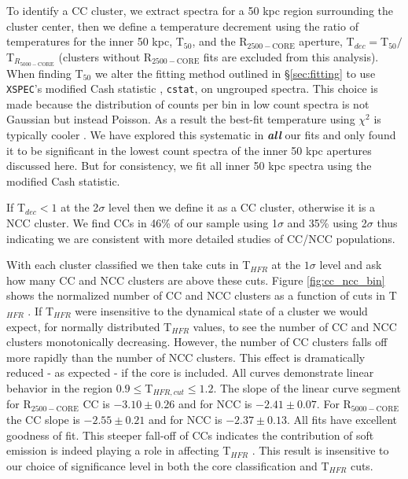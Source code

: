 \documentclass{emulateapj}
\newcommand{\tf}{T$_{HFR}$ }
\begin{document}
To identify a CC cluster, we extract spectra for a 50 kpc region
surrounding the cluster center, then we define a temperature decrement
using the ratio of temperatures for the inner 50 kpc, T$_{50}$, and
the R$_{2500-\text{CORE}}$ aperture, T$_{dec} =
$T$_{50}/$T$_{R_{5000-\text{CORE}}}$ (clusters without
R$_{2500-\text{CORE}}$ fits are excluded from this analysis). When
finding T$_{50}$ we alter the fitting method outlined in
\S\ref{sec:fitting} to use {\tt XSPEC}'s modified Cash statistic
\citep{1979ApJ...228..939C}, {\tt cstat}, on ungrouped
spectra. This choice is made because the distribution of counts per
bin in low count spectra is not Gaussian but instead
Poisson. As a result the best-fit temperature using $\chi^2$ is
typically cooler \citep{1989ApJ...342.1207N, 2007A&A...462..429B}. We
have explored this systematic in {\bfseries\em{all}} our fits and
only found it to be significant in the lowest count spectra of the
inner 50 kpc apertures discussed here. But for consistency, we fit all
inner 50 kpc spectra using the modified Cash statistic.

If T$_{dec} < 1$ at the 2$\sigma$ level then we define it
as a CC cluster, otherwise it is a NCC cluster. We find CCs in 46\% of
our sample using 1$\sigma$ and 35\% using 2$\sigma$ thus indicating we
are consistent with more detailed studies of CC/NCC populations.

With each cluster classified we then take cuts in \tf at the $1\sigma$
level and ask how many CC and NCC clusters are above these cuts. 
Figure \ref{fig:cc_ncc_bin} shows the normalized number of CC and NCC
clusters as a function of cuts in \tf. If \tf were insensitive to
the dynamical state of a cluster we would expect, for normally
distributed \tf values, to see the number of CC and NCC clusters
monotonically decreasing. However, the number of CC clusters falls off
more rapidly than the number of NCC clusters. This effect
is dramatically reduced - as expected - if the core is included. All
curves demonstrate linear behavior in the region $0.9 \leq
$T$_{HFR,cut} \leq 1.2$. The slope of the linear curve segment for
R$_{2500-\text{CORE}}$ CC is $-3.10\pm 0.26$ and for NCC is $-2.41\pm
0.07$. For R$_{5000-\text{CORE}}$ the CC slope is $-2.55\pm 0.21$ and
for NCC is $-2.37\pm 0.13$. All fits have excellent goodness of fit.
This steeper fall-off of CCs indicates the contribution of soft
emission is indeed playing a role in affecting \tf. This result is
insensitive to our choice of significance level in both the core
classification and \tf cuts.
\end{document}
